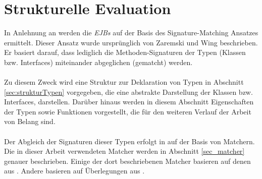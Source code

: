 \section{Strukturelle Evaluation}
In Anlehnung an \cite{hummel08} werden die \emph{EJBs} auf der Basis des Signature-Matching Ansatzes ermittelt. Dieser Ansatz wurde ursprünglich von Zaremski und Wing \cite{moormann} beschrieben. Er basiert darauf, dass lediglich die Methoden-Signaturen der Typen (Klassen bzw. Interfaces) miteinander abgeglichen (gematcht) werden. 
\\\\
Zu diesem Zweck wird eine Struktur zur Deklaration von Typen in Abschnitt \ref{sec:strukturTypen} vorgegeben, die eine abstrakte Darstellung der Klassen bzw. Interfaces, darstellen. Darüber hinaus werden in diesem Abschnitt Eigenschaften der Typen sowie Funktionen vorgestellt, die für den weiteren Verlauf der Arbeit von Belang sind.
\\\\
Der Abgleich der Signaturen dieser Typen erfolgt in \cite{moormann} auf der Basis von Matchern. Die in dieser Arbeit verwendeten Matcher werden in Abschnitt \ref{sec_matcher} genauer beschrieben. Einige der dort beschriebenen Matcher basieren auf denen aus \cite{moormann}. Andere basieren auf Überlegungen aus \cite{hummel08}.
